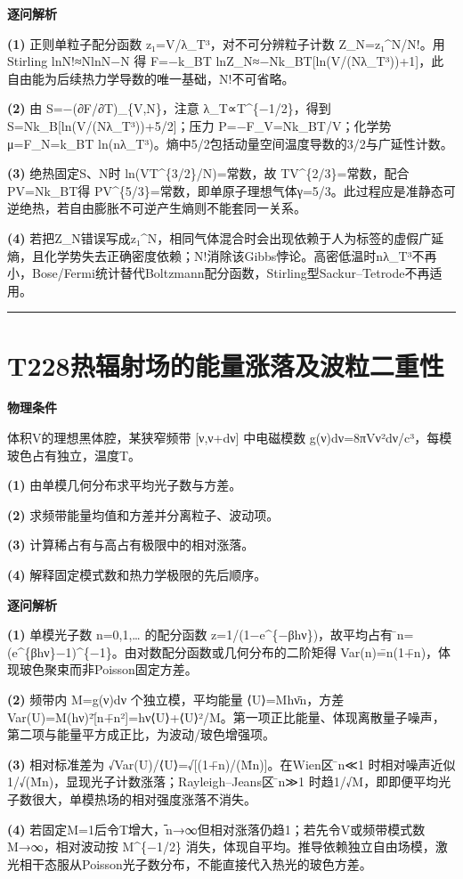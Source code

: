 \documentclass[UTF8,a4paper,11pt,oneside,openany]{ctexbook}
\begin{document}
\par\medskip\noindent\textbf{逐问解析}
\par\noindent\textbf{(1)} 正则单粒子配分函数 z₁=V/λ\_T³，对不可分辨粒子计数 Z\_N=z₁\textasciicircum{}N/N!。用 Stirling lnN!≈NlnN−N 得 F=−k\_BT lnZ\_N≈−Nk\_BT[ln(V/(Nλ\_T³))+1]，此自由能为后续热力学导数的唯一基础，N!不可省略。
\par\noindent\textbf{(2)} 由 S=−(∂F/∂T)\_\{V,N\}，注意 λ\_T∝T\textasciicircum{}\{−1/2\}，得到 S=Nk\_B[ln(V/(Nλ\_T³))+5/2]；压力 P=−F\_V=Nk\_BT/V；化学势 μ=F\_N=k\_BT ln(nλ\_T³)。熵中5/2包括动量空间温度导数的3/2与广延性计数。
\par\noindent\textbf{(3)} 绝热固定S、N时 ln(VT\textasciicircum{}\{3/2\}/N)=常数，故 TV\textasciicircum{}\{2/3\}=常数，配合PV=Nk\_BT得 PV\textasciicircum{}\{5/3\}=常数，即单原子理想气体γ=5/3。此过程应是准静态可逆绝热，若自由膨胀不可逆产生熵则不能套同一关系。
\par\noindent\textbf{(4)} 若把Z\_N错误写成z₁\textasciicircum{}N，相同气体混合时会出现依赖于人为标签的虚假广延熵，且化学势失去正确密度依赖；N!消除该Gibbs悖论。高密低温时nλ\_T³不再小，Bose/Fermi统计替代Boltzmann配分函数，Stirling型Sackur–Tetrode不再适用。

\par\bigskip\hrule\bigskip
\section*{T228\quad 热辐射场的能量涨落及波粒二重性}
\textbf{物理条件}\par 体积V的理想黑体腔，某狭窄频带 [ν,ν+dν] 中电磁模数 g(ν)dν=8πVν²dν/c³，每模玻色占有独立，温度T。
\par\noindent\textbf{(1)} 由单模几何分布求平均光子数与方差。
\par\noindent\textbf{(2)} 求频带能量均值和方差并分离粒子、波动项。
\par\noindent\textbf{(3)} 计算稀占有与高占有极限中的相对涨落。
\par\noindent\textbf{(4)} 解释固定模式数和热力学极限的先后顺序。

\par\medskip\noindent\textbf{逐问解析}
\par\noindent\textbf{(1)} 单模光子数 n=0,1,… 的配分函数 z=1/(1−e\textasciicircum{}\{−βhν\})，故平均占有 ̄n=(e\textasciicircum{}\{βhν\}−1)\textasciicircum{}\{−1\}。由对数配分函数或几何分布的二阶矩得 Var(n)=̄n(1+̄n)，体现玻色聚束而非Poisson固定方差。
\par\noindent\textbf{(2)} 频带内 M=g(ν)dν 个独立模，平均能量 ⟨U⟩=Mhν̄n，方差 Var(U)=M(hν)²[̄n+̄n²]=hν⟨U⟩+⟨U⟩²/M。第一项正比能量、体现离散量子噪声，第二项与能量平方成正比，为波动/玻色增强项。
\par\noindent\textbf{(3)} 相对标准差为 √Var(U)/⟨U⟩=√[(1+̄n)/(M̄n)]。在Wien区 ̄n≪1 时相对噪声近似1/√(M̄n)，显现光子计数涨落；Rayleigh–Jeans区 ̄n≫1 时趋1/√M，即即便平均光子数很大，单模热场的相对强度涨落不消失。
\par\noindent\textbf{(4)} 若固定M=1后令T增大，̄n→∞但相对涨落仍趋1；若先令V或频带模式数M→∞，相对波动按 M\textasciicircum{}\{−1/2\} 消失，体现自平均。推导依赖独立自由场模，激光相干态服从Poisson光子数分布，不能直接代入热光的玻色方差。
\end{document}
